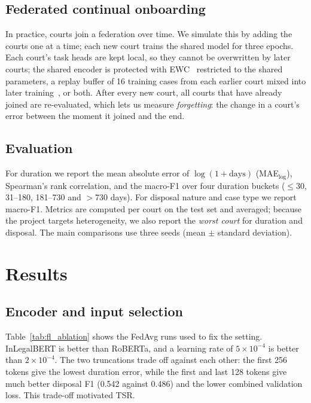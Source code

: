 \subsection{Federated continual onboarding}
In practice, courts join a federation over time. We simulate this by adding the courts one at a time; each new court trains the shared model for three epochs. Each court's task heads are kept local, so they cannot be overwritten by later courts; the shared encoder is protected with EWC~\cite{kirkpatrick2017ewc} restricted to the shared parameters, a replay buffer of 16 training cases from each earlier court mixed into later training~\cite{rolnick2019replay}, or both. After every new court, all courts that have already joined are re-evaluated, which lets us measure \emph{forgetting}: the change in a court's error between the moment it joined and the end.

\subsection{Evaluation}
For duration we report the mean absolute error of $\log(1+\text{days})$ (MAE$_{\log}$), Spearman's rank correlation, and the macro-F1 over four duration buckets ($\le$30, 31--180, 181--730 and $>$730 days). For disposal nature and case type we report macro-F1. Metrics are computed per court on the test set and averaged; because the project targets heterogeneity, we also report the \emph{worst court} for duration and disposal. The main comparisons use three seeds (mean $\pm$ standard deviation).

\section{Results}
\label{sec:results}

\subsection{Encoder and input selection}
Table~\ref{tab:fl_ablation} shows the FedAvg runs used to fix the setting. InLegalBERT is better than RoBERTa, and a learning rate of $5{\times}10^{-4}$ is better than $2{\times}10^{-4}$. The two truncations trade off against each other: the first 256 tokens give the lowest duration error, while the first and last 128 tokens give much better disposal F1 (0.542 against 0.486) and the lower combined validation loss. This trade-off motivated TSR.

